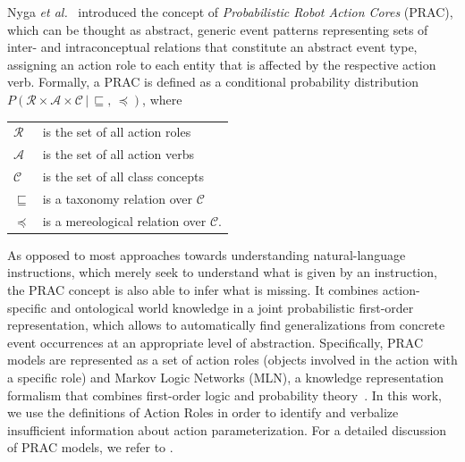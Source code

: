 \documentclass[oribibl]{llncs}
\begin{document}
Nyga \emph{et al.}~\cite{nyga12actioncore} introduced the concept of 
\emph{Probabilistic Robot Action Cores} (PRAC), which can be thought as abstract,
generic event patterns representing sets of 
inter- and intraconceptual relations that constitute an abstract 
event type, assigning an action role to each entity that is affected 
by the respective action verb. Formally, a PRAC is defined as a conditional
probability distribution
$P\left(\mathcal{R}\times\mathcal{A}\times\mathcal{C}\,|\,\sqsubseteq
,\, \preceq \right)\nonumber$, where 

\begin{center} \begin{tabular}{ll}
    $\mathcal{R}$  & is the set of all action roles\\
    $\mathcal{A}$  & is the set of all action verbs\\
    $\mathcal{C}$  & is the set of all class concepts\\
    $\sqsubseteq$ & is a taxonomy relation over $\mathcal{C}$\\
    $\preceq$	& is a mereological relation over $\mathcal{C}$.
\end{tabular}
\end{center}
As opposed to most approaches towards understanding natural-language 
instructions, which merely seek to understand what is given by an 
instruction, the PRAC concept is also able to infer what is missing. 
It combines action-specific and ontological world knowledge in a 
joint probabilistic first-order representation, which allows to 
automatically find generalizations from concrete event occurrences 
at an appropriate level of abstraction. Specifically, PRAC models 
are represented as a set of action roles (objects involved in the 
action with a specific role) and Markov Logic Networks (MLN), a 
knowledge representation formalism that combines first-order logic 
and probability theory~\cite{DBLP:journals/ml/RichardsonD06}. In this
work, we use the definitions of Action Roles in order to identify and
verbalize insufficient information about action parameterization. For a 
detailed discussion of PRAC models, we refer to \cite{nyga12actioncore}.
\end{document}
